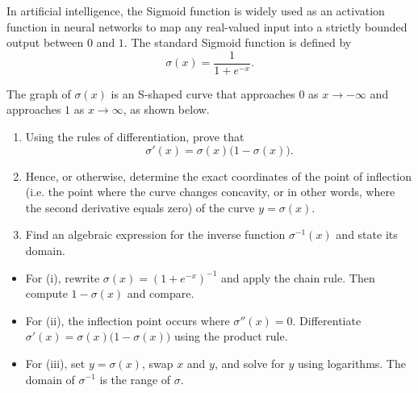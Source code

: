 \begin{problem}
In artificial intelligence, the Sigmoid function is widely used as an activation function in neural networks to map any real-valued input into a strictly bounded output between $0$ and $1$. The standard Sigmoid function is defined by
\[
\sigma(x)=\frac{1}{1+e^{-x}}.
\]

The graph of $\sigma(x)$ is an S-shaped curve that approaches $0$ as $x \to -\infty$ and approaches $1$ as $x \to \infty$, as shown below.

\begin{center}
\end{center}

\begin{enumerate}[label=(\roman*)]
\item Using the rules of differentiation, prove that
\[
\sigma'(x)=\sigma(x)\bigl(1-\sigma(x)\bigr).
\]
\item Hence, or otherwise, determine the exact coordinates of the point of inflection (i.e. the point where the curve changes concavity, or in other words, where the second derivative equals zero) of the curve $y=\sigma(x)$.
\item Find an algebraic expression for the inverse function $\sigma^{-1}(x)$ and state its domain.
\end{enumerate}
\end{problem}



\begin{hint}
\begin{itemize}[leftmargin=*]
\item For (i), rewrite $\sigma(x)=(1+e^{-x})^{-1}$ and apply the chain rule. Then compute $1-\sigma(x)$ and compare.
\item For (ii), the inflection point occurs where $\sigma''(x)=0$. Differentiate $\sigma'(x)=\sigma(x)\bigl(1-\sigma(x)\bigr)$ using the product rule.
\item For (iii), set $y=\sigma(x)$, swap $x$ and $y$, and solve for $y$ using logarithms. The domain of $\sigma^{-1}$ is the range of $\sigma$.
\end{itemize}
\end{hint}

